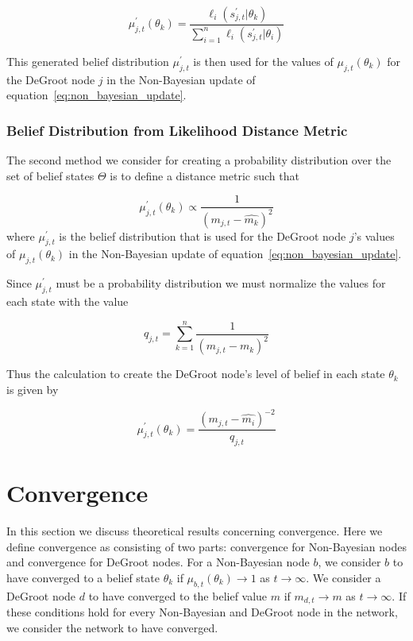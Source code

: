 \documentclass[letterpaper, 10pt, conference]{ieeeconf}
\begin{document}
\begin{equation}
\mu_{j,t}^\prime(\theta_k) = \frac{\ell_i(s_{j,t}^\prime|\theta_k)}{\sum_{i=1}^{n} \ell_i(s_{j,t}^\prime|\theta_i)}
\end{equation}

This generated belief distribution $\mu_{j,t}^\prime$ is then used for the values of $\mu_{j,t}(\theta_k)$ for the DeGroot node $j$ in the Non-Bayesian update of equation~\ref{eq:non_bayesian_update}.

\subsubsection{Belief Distribution from Likelihood Distance Metric}
\label{sec:likelihood_metric}

The second method we consider for creating a probability distribution over the set of belief states $\Theta$ is to define a distance metric such that

\begin{equation}
\mu_{j,t}^\prime(\theta_k) \propto \frac{1}{(m_{j,t}-\hat{m_k})^2}
\end{equation}
where $\mu_{j,t}^\prime$ is the belief distribution that is used for the DeGroot node $j$'s values of $\mu_{j,t}(\theta_k)$ in the Non-Bayesian update of equation~\ref{eq:non_bayesian_update}.

Since $\mu_{j,t}^\prime$ must be a probability distribution we must normalize the values for each state with the value

\begin{equation}
q_{j,t} = \sum_{k=1}^n \frac{1}{(m_{j,t}-\hat{m_k})^2}
\end{equation}

Thus the calculation to create the DeGroot node's level of belief in each state $\theta_k$ is given by

\begin{equation}
\mu_{j,t}^\prime(\theta_k) = \frac{(m_{j,t}-\hat{m_i})^{-2}}{q_{j,t}}
\end{equation}


\section{Convergence}
In this section we discuss theoretical results concerning convergence.  Here we define convergence as consisting of two parts: convergence for Non-Bayesian nodes and convergence for DeGroot nodes.  For a Non-Bayesian node $b$, we consider $b$ to have converged to a belief state $\theta_{k}$ if $\mu_{b,t}(\theta_k) \to 1$ as $t \to \infty$.  We consider a DeGroot node $d$ to have converged to the belief value $m$ if $m_{d,t} \to m$ as $t \to \infty$.  If these conditions hold for every Non-Bayesian and DeGroot node in the network, we consider the network to have converged.
\end{document}
